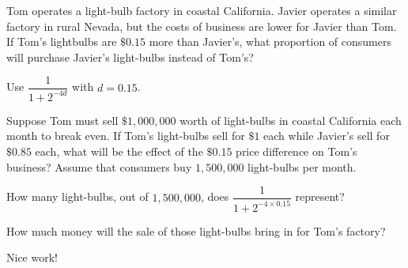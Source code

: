 \documentclass{ximera}
\begin{document}
\begin{question}

Tom operates a light-bulb factory in coastal California. Javier operates a similar factory in rural Nevada, but the costs of business are lower for Javier than Tom. If Tom's lightbulbs are $\$0.15$ more than Javier's, what proportion of consumers will purchase Javier's light-bulbs instead of Tom's?

\begin{multipleChoice}
\end{multipleChoice}
\begin{hint}
Use $\dfrac{1}{1+2^{-4d}}$ with $d=0.15$.
\end{hint}

\end{question}


\begin{question}
Suppose Tom must sell $\$1,000,000$ worth of light-bulbs in coastal California each month to break even. If Tom's light-bulbs sell for $\$1$ each while Javier's sell for $\$0.85$ each, what will be the effect of the $\$0.15$ price difference on Tom's business? Assume that consumers buy $1,500,000$ light-bulbs per month. 


\begin{multipleChoice}
    \end{multipleChoice}
\begin{hint}
How many light-bulbs, out of $1,500,000$, does $\dfrac{1}{1+2^{-4\times 0.15}}$ represent?
\end{hint}
\begin{hint}
How much money will the sale of those light-bulbs bring in for Tom's factory?
\end{hint}

Nice work!
\end{question}
\end{document}
